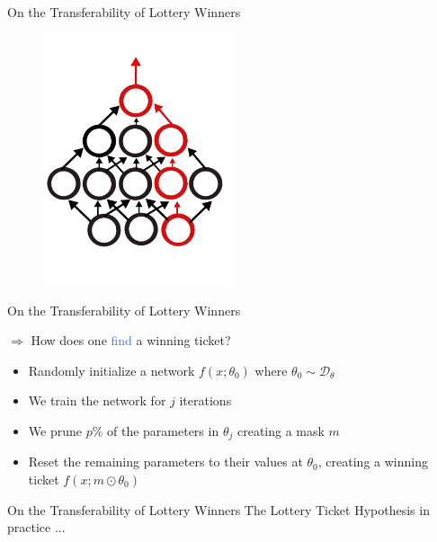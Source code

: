 \documentclass{beamer}
\begin{document}
\begin{frame}{On the Transferability of Lottery Winners}

	\begin{figure}
		\includegraphics[width=0.5\textwidth]{figures/random_ticket_2.pdf}
	\end{figure}

\end{frame}


\begin{frame}{On the Transferability of Lottery Winners}

	$\Rightarrow$ How does one \textcolor{RoyalBlue}{find} a winning ticket?
	
	\begin{itemize}
		\item Randomly initialize a network $f(x;\theta_0)$ where $\theta_0 \sim \mathcal{D}_{\theta}$
		\item We train the network for $j$ iterations
		\item We prune $p\%$ of the parameters in $\theta_j$ creating a mask $m$
		\item Reset the remaining parameters to their values at $\theta_0$, creating a winning ticket $f(x;m \odot \theta_0)$
	\end{itemize}

\end{frame}


\begin{frame}{On the Transferability of Lottery Winners}
	The Lottery Ticket Hypothesis in practice ...

	
\end{frame}
\end{document}
